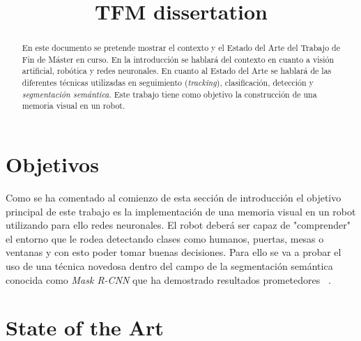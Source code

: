 \documentclass{bmvc2k}
\title{TFM dissertation}
\begin{document}
\maketitle

\begin{abstract}
En este documento se pretende mostrar el contexto y el Estado del Arte del Trabajo de Fin de Máster en curso. En la introducción se hablará del contexto en cuanto a visión artificial, robótica y redes neuronales. En cuanto al Estado del Arte se hablará de las diferentes técnicas utilizadas en seguimiento (\textit{tracking}), clasificación, detección y \textit{segmentación semántica}. Este trabajo tiene como objetivo la construcción de una memoria visual en un robot.
\end{abstract}
\section{Objetivos}
Como se ha comentado al comienzo de esta sección de introducción el objetivo principal de este trabajo es la implementación de una memoria visual en un robot utilizando para ello redes neuronales. El robot deberá ser capaz de "comprender" el entorno que le rodea detectando clases como humanos, puertas, mesas o ventanas y con esto poder tomar buenas decisiones. Para ello se va a probar el uso de una técnica novedosa dentro del campo de la segmentación semántica conocida como \textit{Mask R-CNN} que ha demostrado resultados prometedores ~\cite{he2017mask}.
\section{State of the Art}

\label{sec:intro}

\end{document}
